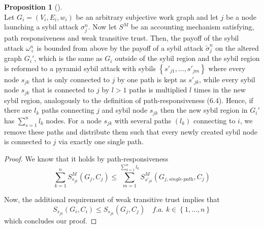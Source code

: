 \documentclass[11pt,a4paper]{article}
\theoremstyle{definition}
\newtheorem{definition}{Definition}[section]
\theoremstyle{theorem}
\theoremstyle{proposition}
\newtheorem{proposition}{Proposition}[section]
\theoremstyle{corollary}
\theoremstyle{lemma}
\theoremstyle{example}
\theoremstyle{remark}
\begin{document}

\begin{proposition}[]\ \\
Let $G_i=(V_i,E_i,w_i)$ be an arbitrary subjective work graph and let $j$ be a node launching a sybil attack $\sigma_j^n$. Now let $S^M$ be an accounting mechanism satisfying, path responsiveness and weak transitive trust. Then, the payoff of the sybil attack $\omega_{+}^n$ is bounded from above by the payoff of a sybil attack $\tilde{\sigma}_j^n$ on the altered graph $G_i'$, which is the same as $G_i$ outside of the sybil region and the sybil region is reformed to a pyramid sybil attack with sybils $\left\lbrace{}s'_{j1},\ldots,s'_{jm}\right\rbrace$ where every node $s_{jk}$ that is only connected to $j$ by one path is kept as $s'_{jk}$, while every sybil node $s_{jk}$ that is connected to $j$ by $l>1$ paths is multiplied $l$ times in the new sybil region, analogously to the definition of path-responsiveness (6.4). Hence, if there are $l_k$ paths connecting $j$ and sybil node $s_{jk}$ then the new sybil region in $G_i'$ has $\sum\limits_{s=1}^{n}l_k$ nodes. For a node $s_{jk}$ with several paths $(l_k)$ connecting to $i$, we remove these paths and distribute them such that every newly created sybil node is connected to $j$ via exactly one single path.  
\end{proposition}
\begin{proof}
We know that it holds by path-responsiveness 
\[
\sum\limits_{k=1}^{n}S^M_{s_{jk}}(G_j,C_j)\leq\sum\limits_{m=1}^{\sum\limits_{k=1}^{n}l_k}S^M_{s'_{jk}}(G_{j,\textit{single-path}},C_j)
\] 

\noindent{}Now, the additional requirement of weak transitive trust implies that 
\[
S_{s_{jk}}(G_i,C_i)\leq{}S_{s_{jk}}(G_j,C_j)\quad\textit{f.a. }k\in\left\lbrace{}1,\ldots,n\right\rbrace
\]
\noindent{} which concludes our proof. 
\end{proof}
\end{document}
